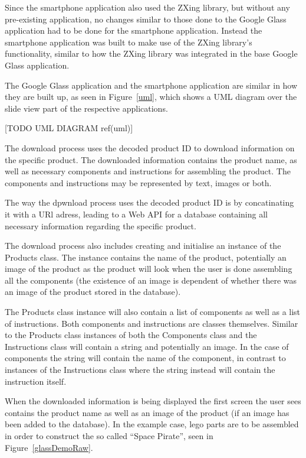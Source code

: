 Since the smartphone application also used the ZXing library, but without any pre-existing application, no changes similar to those done to the Google Glass application had to be done for the smartphone application. Instead the smartphone application was built to make use of the ZXing library's functionality, similar to how the ZXing library was integrated in the base Google Glass application.

The Google Glass application and the smartphone application are similar in how they are built up, as seen in Figure~\ref{uml}, which shows a UML diagram over the slide view part of the respective applications.

[TODO UML DIAGRAM ref(uml)]




The download process uses the decoded product ID to download information on the specific product. The downloaded information contains the product name, as well as necessary components and instructions for assembling the product. The components and instructions may be represented by text, images or both. 

The way the dpwnload process uses the decoded product ID is by concatinating it with a URl adress, leading to a Web API for a database containing all necessary information regarding the specific product.

The download process also includes creating and initialise an instance of the Products class. The instance contains the name of the product, potentially an image of the product as the product will look when the user is done assembling all the components (the existence of an image is dependent of whether there was an image of the product stored in the database).

The Products class instance will also contain a list of components as well as a list of instructions. Both components and instructions are classes themselves. Similar to the Products class instances of both the Components class and the Instructions class will contain a string and potentially an image. In the case of components the string will contain the name of the component, in contrast to instances of the Instructions class where the string instead will contain the instruction itself.

When the downloaded information is being displayed the first screen the user sees contains the product name as well as an image of the product (if an image has been added to the database). In the example case, lego parts are to be assembled in order to construct the so called ``Space Pirate'', seen in Figure~\ref{glassDemoRaw}.

